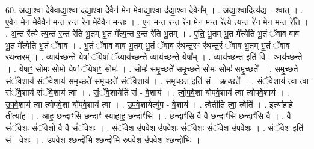 \documentclass[17pt]{extarticle}
\begin{document}
60. अ॒द्या॒श्वा दे॒वैवाद्या॒श्वा द॑द्या॒श्वा दे॒वैन॑ मेन मे॒वाद्या॒श्वा द॑द्या॒श्वा दे॒वैन᳚म् । . अ॒द्या॒श्वादित्य॑द्य - श्वात् । . ए॒वैन॑ मेन मे॒वैवैन॑ म॒न्त र॒न्त रे॑न मे॒वैवैन॑ म॒न्तः । . ए॒न॒ म॒न्त र॒न्त रे॑न मेन म॒न्त रे᳚त्ये त्य॒न्त रे॑न मेन म॒न्त रे॑ति । . अ॒न्त रे᳚त्ये त्य॒न्त र॒न्त रे॑ति भू॒तम् भू॒त मे᳚त्य॒न्त र॒न्त रे॑ति भू॒तम् । . ए॒ति॒ भू॒तम् भू॒त मे᳚त्येति भू॒तं ॅवाव वाव भू॒त मे᳚त्येति भू॒तं ॅवाव । . भू॒तं ॅवाव वाव भू॒तम् भू॒तं ॅवाव र॑थन्त॒रꣳ र॑थन्त॒रं ॅवाव भू॒तम् भू॒तं ॅवाव र॑थन्त॒रम् । . व्याय॑च्छन्ते॒ येषां॒ ॅयेषां॒ ॅव्याय॑च्छन्ते॒ व्याय॑च्छन्ते॒ येषा᳚म् । . व्याय॑च्छन्त॒ इति॑ वि - आय॑च्छन्ते । . येषाꣳ॒॒ सोमः॒ सोमो॒ येषां॒ ॅयेषाꣳ॒॒ सोमः॑ । . सोमः॑ समृ॒च्छते॑ समृ॒च्छते॒ सोमः॒ सोमः॑ समृ॒च्छते᳚ । . स॒मृ॒च्छते॑ संॅवे॒शाय॑ संॅवे॒शाय॑ समृ॒च्छते॑ समृ॒च्छते॑ संॅवे॒शाय॑ । . स॒मृ॒च्छत॒ इति॑ सं - ऋ॒च्छते᳚ । . सं॒ॅवे॒शाय॑ त्वा त्वा संॅवे॒शाय॑ संॅवे॒शाय॑ त्वा । . सं॒ॅवे॒शायेति॑ सं - वे॒शाय॑ । . त्वो॒प॒वे॒शा यो॑पवे॒शाय॑ त्वा त्वोपवे॒शाय॑ । . उ॒प॒वे॒शाय॑ त्वा त्वोपवे॒शा यो॑पवे॒शाय॑ त्वा । . उ॒प॒वे॒शायेत्यु॑प - वे॒शाय॑ । . त्वेतीति॑ त्वा॒ त्वेति॑ । . इत्या॑हा॒हे तीत्या॑ह । . आ॒ह॒ छन्दाꣳ॑सि॒ छन्दाꣳ॑ स्याहाह॒ छन्दाꣳ॑सि । . छन्दाꣳ॑सि॒ वै वै छन्दाꣳ॑सि॒ छन्दाꣳ॑सि॒ वै । . वै सं॑ॅवे॒शः सं॑ॅवे॒शो वै वै सं॑ॅवे॒शः । . सं॒ॅवे॒श उ॑पवे॒श उ॑पवे॒शः सं॑ॅवे॒शः सं॑ॅवे॒श उ॑पवे॒शः । . सं॒ॅवे॒श इति॑ सं - वे॒शः । . उ॒प॒वे॒श श्छन्दो॑भि॒ श्छन्दो॑भि रुपवे॒श उ॑पवे॒श श्छन्दो॑भिः । \newline
\end{document}
